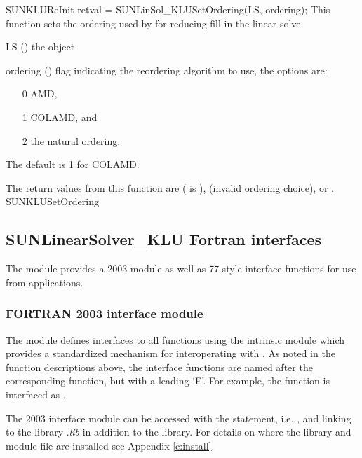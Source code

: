 {SUNKLUReInit}
%
%
{
  retval = SUNLinSol\_KLUSetOrdering(LS, ordering);
}
{
  This function sets the ordering used by {\klu} for reducing fill in
  the linear solve.
}
{
  \begin{args}[ordering]
  \item[LS] ()
    the {\sunlinsolklu} object
  \item[ordering] ()
    flag indicating the reordering algorithm to use, the options are:
    \begin{itemize}
    \item[0] AMD,
    \item[1] COLAMD, and
    \item[2] the natural ordering.
    \end{itemize}
    The default is 1 for COLAMD.
  \end{args}
}
{
  The return values from this function are 
  ( is ), 
  (invalid ordering choice), or .
}
{}
{SUNKLUSetOrdering}


\subsection{SUNLinearSolver\_KLU Fortran interfaces}
\label{ss:sunlinsol_klu_fortran}

The {\sunlinsolklu} module provides a {\F} 2003 module as well as {\F} 77
style interface functions for use from {\F} applications.

\subsubsection*{FORTRAN 2003 interface module}
The  {\F} module defines interfaces to all
{\sunlinsolklu} {\CC} functions using the intrinsic 
module which provides a standardized mechanism for interoperating with {\CC}. As
noted in the {\CC} function descriptions above, the interface functions are
named after the corresponding {\CC} function, but with a leading `F'. For
example, the function  is interfaced as
.

The {\F} 2003 {\sunlinsolklu} interface module can be accessed with the 
statement, i.e. , and linking to the library
.{\em lib} in addition to the {\CC} library.
For details on where the library and module file
 are installed see Appendix \ref{c:install}.

